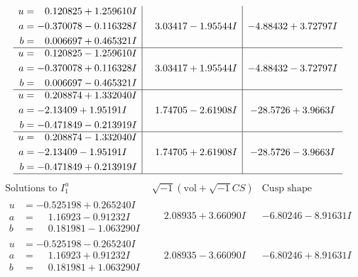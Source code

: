 \documentclass[1p]{elsarticle_modified}
\theoremstyle{definition}
\newcommand{\I}{\sqrt{-1}}
\begin{document}
$$\begin{array}{c|c|c}
\begin{aligned}
u &= \phantom{-}0.120825 + 1.259610 I \\
a &= -0.370078 - 0.116328 I \\
b &= \phantom{-}0.006697 + 0.465321 I\end{aligned}
 & \phantom{-}3.03417 - 1.95544 I & -4.88432 + 3.72797 I \\ \hline\begin{aligned}
u &= \phantom{-}0.120825 - 1.259610 I \\
a &= -0.370078 + 0.116328 I \\
b &= \phantom{-}0.006697 - 0.465321 I\end{aligned}
 & \phantom{-}3.03417 + 1.95544 I & -4.88432 - 3.72797 I \\ \hline\begin{aligned}
u &= \phantom{-}0.208874 + 1.332040 I \\
a &= -2.13409 + 1.95191 I \\
b &= -0.471849 - 0.213919 I\end{aligned}
 & \phantom{-}1.74705 - 2.61908 I & -28.5726 + 3.9663 I \\ \hline\begin{aligned}
u &= \phantom{-}0.208874 - 1.332040 I \\
a &= -2.13409 - 1.95191 I \\
b &= -0.471849 + 0.213919 I\end{aligned}
 & \phantom{-}1.74705 + 2.61908 I & -28.5726 - 3.9663 I\\
 \hline 
 \end{array}$$\newpage$$\begin{array}{c|c|c}  
\text{Solutions to }I^u_{1}& \I (\text{vol} + \sqrt{-1}CS) & \text{Cusp shape}\\
 \hline 
\begin{aligned}
u &= -0.525198 + 0.265240 I \\
a &= \phantom{-}1.16923 - 0.91232 I \\
b &= \phantom{-}0.181981 - 1.063290 I\end{aligned}
 & \phantom{-}2.08935 + 3.66090 I & -6.80246 - 8.91631 I \\ \hline\begin{aligned}
u &= -0.525198 - 0.265240 I \\
a &= \phantom{-}1.16923 + 0.91232 I \\
b &= \phantom{-}0.181981 + 1.063290 I\end{aligned}
 & \phantom{-}2.08935 - 3.66090 I & -6.80246 + 8.91631 I \\ \hline\begin{aligned}

\end{aligned}
\end{array}$$
\end{document}
